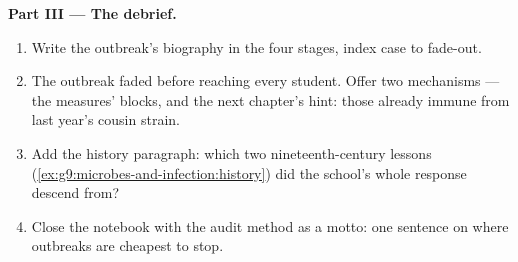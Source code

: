 \begin{problem}
\medskip\noindent\textbf{Part III --- The debrief.}
\begin{enumerate}[resume]
  \item Write the outbreak's biography in the four
        stages, index case to fade-out.
  \item The outbreak faded before reaching every
        student. Offer two mechanisms --- the measures'
        blocks, and the next chapter's hint: those
        already immune from last year's cousin strain.
  \item Add the history paragraph: which two
        nineteenth-century lessons
        (\cref{ex:g9:microbes-and-infection:history})
        did the school's whole response descend from?
  \item Close the notebook with the audit method as a
        motto: one sentence on where outbreaks are
        cheapest to stop.
\end{enumerate}
\end{problem}
